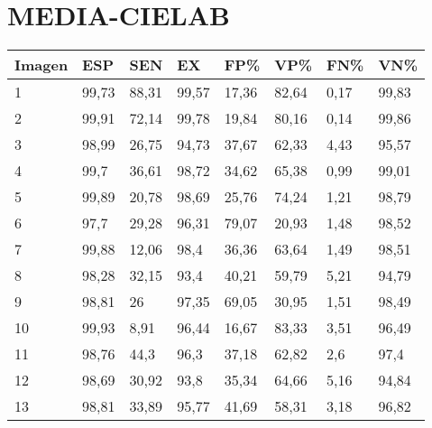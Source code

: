 \section{MEDIA-CIELAB}
\begin{longtable}[c]{|l|l|l|l|l|l|l|l|}
\hline
\textbf{Imagen} & \textbf{ESP} & \textbf{SEN} & \textbf{EX} & \textbf{FP\%} & \textbf{VP\%} & \textbf{FN\%} & \textbf{VN\%} \\ \hline
\endfirsthead
%
\endhead
%
1               & 99,73        & 88,31        & 99,57       & 17,36         & 82,64         & 0,17          & 99,83         \\ \hline
2               & 99,91        & 72,14        & 99,78       & 19,84         & 80,16         & 0,14          & 99,86         \\ \hline
3               & 98,99        & 26,75        & 94,73       & 37,67         & 62,33         & 4,43          & 95,57         \\ \hline
4               & 99,7         & 36,61        & 98,72       & 34,62         & 65,38         & 0,99          & 99,01         \\ \hline
5               & 99,89        & 20,78        & 98,69       & 25,76         & 74,24         & 1,21          & 98,79         \\ \hline
6               & 97,7         & 29,28        & 96,31       & 79,07         & 20,93         & 1,48          & 98,52         \\ \hline
7               & 99,88        & 12,06        & 98,4        & 36,36         & 63,64         & 1,49          & 98,51         \\ \hline
8               & 98,28        & 32,15        & 93,4        & 40,21         & 59,79         & 5,21          & 94,79         \\ \hline
9               & 98,81        & 26           & 97,35       & 69,05         & 30,95         & 1,51          & 98,49         \\ \hline
10              & 99,93        & 8,91         & 96,44       & 16,67         & 83,33         & 3,51          & 96,49         \\ \hline
11              & 98,76        & 44,3         & 96,3        & 37,18         & 62,82         & 2,6           & 97,4          \\ \hline
12              & 98,69        & 30,92        & 93,8        & 35,34         & 64,66         & 5,16          & 94,84         \\ \hline
13              & 98,81        & 33,89        & 95,77       & 41,69         & 58,31         & 3,18          & 96,82         \\ \hline

\end{longtable}
